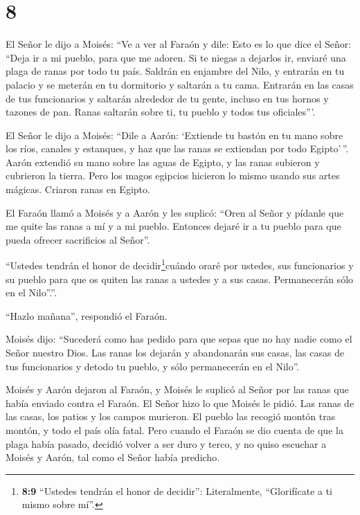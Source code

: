 \hypertarget{section-7}{%
\section{8}\label{section-7}}

 El Señor le dijo a Moisés: ``Ve a ver al Faraón y dile:
Esto es lo que dice el Señor: ``Deja ir a mi pueblo, para que me adoren.
 Si te niegas a dejarlos ir, enviaré una plaga de ranas por
todo tu país.  Saldrán en enjambre del Nilo, y entrarán en
tu palacio y se meterán en tu dormitorio y saltarán a tu cama. Entrarán
en las casas de tus funcionarios y saltarán alrededor de tu gente,
incluso en tus hornos y tazones de pan.  Ranas saltarán
sobre ti, tu pueblo y todos tus oficiales'''.

 El Señor le dijo a Moisés: ``Dile a Aarón: `Extiende tu
bastón en tu mano sobre los ríos, canales y estanques, y haz que las
ranas se extiendan por todo Egipto'\,''.  Aarón extendió su
mano sobre las aguas de Egipto, y las ranas subieron y cubrieron la
tierra.  Pero los magos egipcios hicieron lo mismo usando
sus artes mágicas. Criaron ranas en Egipto.

 El Faraón llamó a Moisés y a Aarón y les suplicó: ``Oren al
Señor y pídanle que me quite las ranas a mí y a mi pueblo. Entonces
dejaré ir a tu pueblo para que pueda ofrecer sacrificios al Señor''.

 ``Ustedes tendrán el honor de decidir\footnote{\textbf{8:9}
  ``Ustedes tendrán el honor de decidir'': Literalmente, ``Glorifícate a
  ti mismo sobre mí''.}cuándo oraré por ustedes, sus funcionarios y su
pueblo para que os quiten las ranas a ustedes y a sus casas.
Permanecerán sólo en el Nilo''.''.

 ``Hazlo mañana'', respondió el Faraón.

Moisés dijo: ``Sucederá como has pedido para que sepas que no hay nadie
como el Señor nuestro Dios.  Las ranas los dejarán y
abandonarán sus casas, las casas de tus funcionarios y detodo tu pueblo,
y sólo permanecerán en el Nilo''.

 Moisés y Aarón dejaron al Faraón, y Moisés le suplicó al
Señor por las ranas que había enviado contra el Faraón.  El
Señor hizo lo que Moisés le pidió. Las ranas de las casas, los patios y
los campos murieron.  El pueblo las recogió montón tras
montón, y todo el país olía fatal.  Pero cuando el Faraón
se dio cuenta de que la plaga había pasado, decidió volver a ser duro y
terco, y no quiso escuchar a Moisés y Aarón, tal como el Señor había
predicho.

